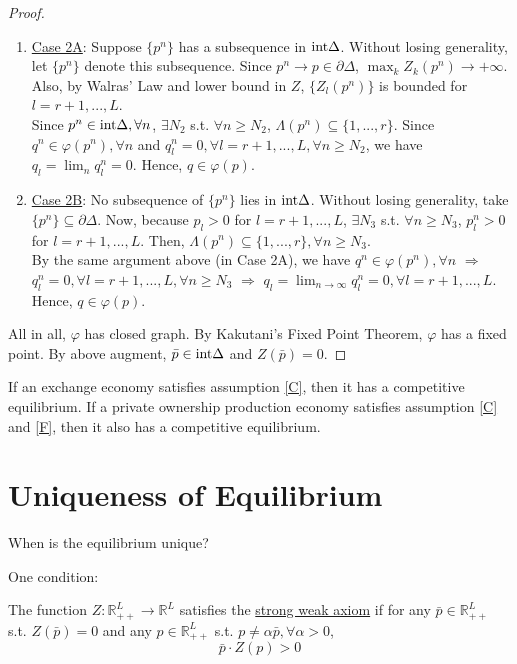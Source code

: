 \documentclass[11pt]{elegantbook}
\begin{document}
\begin{proof}
\begin{enumerate}[$\circ$]
        \begin{enumerate}[-]
            \item \underline{Case 2A}: Suppose $\{p^n\}$ has a subsequence in $\textnormal{int}\Delta$. Without losing generality, let $\{p^n\}$ denote this subsequence. Since $p^n \rightarrow p\in\partial \Delta$, $\max_k Z_k(p^n) \rightarrow +\infty$. Also, by Walras' Law and lower bound in $Z$, $\{Z_l(p^n)\}$ is bounded for $l=r+1,...,L$.\\
            Since $p^n\in \textnormal{int}\Delta, \forall n$, $\exists N_2$ s.t. $\forall n\geq N_2$, $\Lambda(p^n)\subseteq \{1,...,r\}$. Since $q^n\in \varphi(p^n), \forall n$ and $q^n_l=0,\forall l=r+1,...,L, \forall n\geq N_2$, we have $q_l=\lim_n q_l^n=0$. Hence, $q\in \varphi(p)$.
            \item \underline{Case 2B}: No subsequence of $\{p^n\}$ lies in $\textnormal{int}\Delta$. Without losing generality, take $\{p^n\}\subseteq \partial \Delta$. Now, because $p_l>0$ for $l=r+1,...,L$, $\exists N_3$ s.t. $\forall n\geq N_3$, $p^n_l>0$ for $l=r+1,...,L$. Then, $\Lambda(p^n)\subseteq \{1,...,r\}, \forall n\geq N_3$.\\
            By the same argument above (in Case 2A), we have $q^n\in\varphi(p^n),\forall n$ $\Rightarrow$ $q^n_l=0,\forall l=r+1,...,L, \forall n\geq N_3$ $\Rightarrow$ $q_l=\lim_{n \rightarrow \infty}q_l^n=0, \forall l=r+1,...,L$. Hence, $q\in\varphi(p)$.
        \end{enumerate}
    \end{enumerate}
    All in all, $\varphi$ has closed graph. By Kakutani's Fixed Point Theorem, $\varphi$ has a fixed point. By above augment, $\bar{p}\in \textnormal{int}\Delta$ and $Z(\bar{p})=0$.
\end{proof}


\begin{corollary}
    If an exchange economy satisfies assumption \ref{C}, then it has a competitive equilibrium. If a private ownership production economy satisfies assumption \ref{C} and \ref{F}, then it also has a competitive equilibrium.
\end{corollary}


\section{Uniqueness of Equilibrium}
When is the equilibrium unique?

One condition:
\begin{definition}
    \normalfont
    The function $Z: \mathbb{R}_{++}^L \rightarrow \mathbb{R}^L$ satisfies the \underline{strong weak axiom} if for any $\bar{p}\in \mathbb{R}_{++}^L$ s.t. $Z(\bar{p})=0$ and any $p\in \mathbb{R}^L_{++}$ s.t. $p\neq \alpha\bar{p}, \forall \alpha>0$, $$\bar{p}\cdot Z(p)>0$$
\end{definition}
\end{document}
